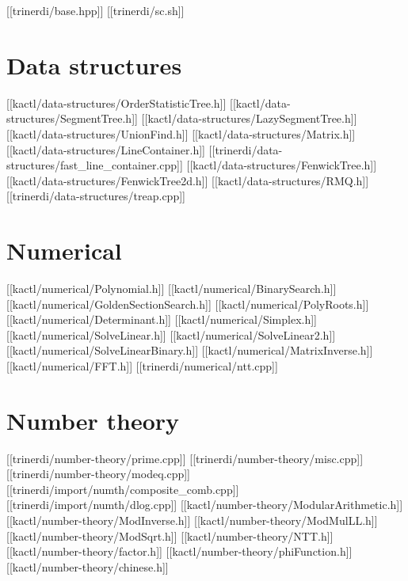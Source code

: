 



[[trinerdi/base.hpp]]
[[trinerdi/sc.sh]]

\chapter{Data structures}

[[kactl/data-structures/OrderStatisticTree.h]]
[[kactl/data-structures/SegmentTree.h]]
[[kactl/data-structures/LazySegmentTree.h]]
[[kactl/data-structures/UnionFind.h]]
[[kactl/data-structures/Matrix.h]]
[[kactl/data-structures/LineContainer.h]]
[[trinerdi/data-structures/fast_line_container.cpp]]
[[kactl/data-structures/FenwickTree.h]]
[[kactl/data-structures/FenwickTree2d.h]]
[[kactl/data-structures/RMQ.h]]
[[trinerdi/data-structures/treap.cpp]]

\chapter{Numerical}

[[kactl/numerical/Polynomial.h]]
[[kactl/numerical/BinarySearch.h]]
[[kactl/numerical/GoldenSectionSearch.h]]
[[kactl/numerical/PolyRoots.h]]
[[kactl/numerical/Determinant.h]]
[[kactl/numerical/Simplex.h]]
[[kactl/numerical/SolveLinear.h]]
[[kactl/numerical/SolveLinear2.h]]
[[kactl/numerical/SolveLinearBinary.h]]
[[kactl/numerical/MatrixInverse.h]]
[[kactl/numerical/FFT.h]]
[[trinerdi/numerical/ntt.cpp]]

\chapter{Number theory}
[[trinerdi/number-theory/prime.cpp]]
[[trinerdi/number-theory/misc.cpp]]
[[trinerdi/number-theory/modeq.cpp]]
[[trinerdi/import/numth/composite_comb.cpp]]
[[trinerdi/import/numth/dlog.cpp]]
[[kactl/number-theory/ModularArithmetic.h]]
[[kactl/number-theory/ModInverse.h]]
[[kactl/number-theory/ModMulLL.h]]
[[kactl/number-theory/ModSqrt.h]]
[[kactl/number-theory/NTT.h]]
[[kactl/number-theory/factor.h]]
[[kactl/number-theory/phiFunction.h]]
[[kactl/number-theory/chinese.h]]

